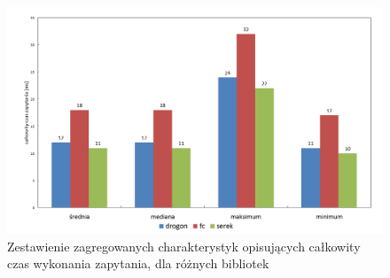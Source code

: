 \documentclass[12pt]{article}
\begin{document}
	{
		\begin{figure}[H]
			\centering
			\includegraphics[width=15cm,keepaspectratio=true]{./charts/pre_generated_charts/total_request_time_per_library_summary.png}
			\caption{Zestawienie zagregowanych charakterystyk opisujących całkowity czas wykonania zapytania, dla różnych bibliotek}
			\medskip
		\end{figure}
	}


\end{document}

